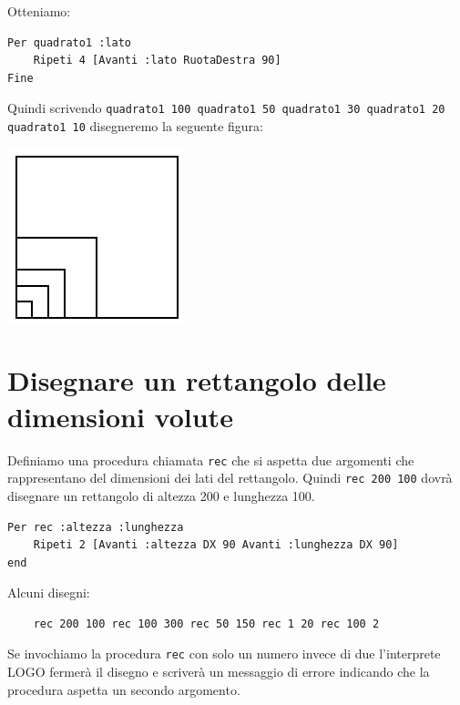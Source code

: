 Otteniamo:
\begin{lstlisting}[caption="Un programma per disegnare quadrati di qualsiasi lato"]
Per quadrato1 :lato
	Ripeti 4 [Avanti :lato RuotaDestra 90]
Fine
\end{lstlisting}

Quindi scrivendo \texttt{quadrato1 100 quadrato1 50 quadrato1 30 quadrato1 20 quadrato1 10} disegneremo la seguente figura:\\
\begin{center}
	\includegraphics[scale=0.5]{pics/variables-carres.png}
\end{center}
\vspace{1cm}



\section{Disegnare un rettangolo delle dimensioni volute}
Definiamo una procedura chiamata \texttt{rec} che si aspetta due argomenti che rappresentano del dimensioni dei lati del rettangolo. Quindi \texttt{rec 200 100} dovrà disegnare un rettangolo di altezza 200 e lunghezza 100.
\begin{lstlisting}[caption="Rettangoli di qualiasi dimensione"]
Per rec :altezza :lunghezza
	Ripeti 2 [Avanti :altezza DX 90 Avanti :lunghezza DX 90]
end
\end{lstlisting} 

Alcuni disegni: 
\begin{lstlisting}
	rec 200 100 rec 100 300 rec 50 150 rec 1 20 rec 100 2 
\end{lstlisting}

Se invochiamo la procedura \texttt{rec} con solo un numero invece di due l'interprete LOGO fermerà il disegno e scriverà un messaggio di errore indicando che la procedura aspetta un secondo argomento.



